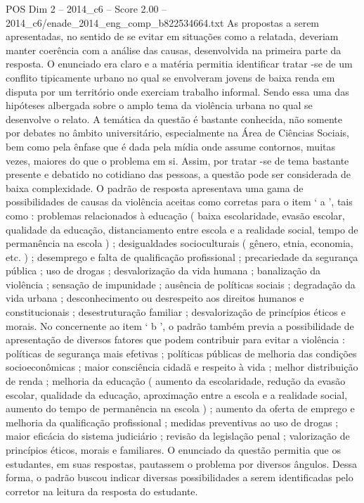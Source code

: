 \begin{textsample}{POS Dim 2 – 2014\_c6 – Score 2.00 – 2014\_c6/enade\_2014\_eng\_comp\_b822534664.txt}
As propostas a serem apresentadas, no sentido de se evitar em situações como a relatada, deveriam manter coerência com a análise das causas, desenvolvida na primeira parte da resposta.
O enunciado era claro e a matéria permitia identificar tratar -se de um conflito tipicamente urbano no qual se envolveram jovens de baixa renda em disputa por um território onde exerciam trabalho informal.
Sendo essa uma das hipóteses albergada sobre o amplo tema da violência urbana no qual se desenvolve o relato.
A temática da questão é bastante conhecida, não somente por debates no âmbito universitário, especialmente na Área de Ciências Sociais, bem como pela ênfase que é dada pela mídia onde assume contornos, muitas vezes, maiores do que o problema em si.
Assim, por tratar -se de tema bastante presente e debatido no cotidiano das pessoas, a questão pode ser considerada de baixa complexidade.
O padrão de resposta apresentava uma gama de possibilidades de causas da violência aceitas como corretas para o item ‘ a ’, tais como : problemas relacionados à educação ( baixa escolaridade, evasão escolar, qualidade da educação, distanciamento entre escola e a realidade social, tempo de permanência na escola ) ; desigualdades socioculturais ( gênero, etnia, economia, etc. ) ; desemprego e falta de qualificação profissional ; precariedade da segurança pública ; uso de drogas ; desvalorização da vida humana ; banalização da violência ; sensação de impunidade ; ausência de políticas sociais ; degradação da vida urbana ; desconhecimento ou desrespeito aos direitos humanos e constitucionais ; desestruturação familiar ; desvalorização de princípios éticos e morais.
No concernente ao item ‘ b ’, o padrão também previa a possibilidade de apresentação de diversos fatores que podem contribuir para evitar a violência : políticas de segurança mais efetivas ; políticas públicas de melhoria das condições socioeconômicas ; maior consciência cidadã e respeito à vida ; melhor distribuição de renda ; melhoria da educação ( aumento da escolaridade, redução da evasão escolar, qualidade da educação, aproximação entre a escola e a realidade social, aumento do tempo de permanência na escola ) ; aumento da oferta de emprego e melhoria da qualificação profissional ; medidas preventivas ao uso de drogas ; maior eficácia do sistema judiciário ; revisão da legislação penal ; valorização de princípios éticos, morais e familiares.
O enunciado da questão permitia que os estudantes, em suas respostas, pautassem o problema por diversos ângulos.
Dessa forma, o padrão buscou indicar diversas possibilidades a serem identificadas pelo corretor na leitura da resposta do estudante.

\end{textsample}
